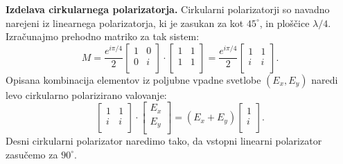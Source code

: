 \begin{example}{\bf Izdelava cirkularnega polarizatorja.}
\label{ex_circ}
Cirkularni polarizatorji so navadno narejeni iz linearnega polarizatorja, ki 
je zasukan za kot $45^\circ$, in ploščice $\lambda/4$. Izračunajmo prehodno 
matriko za tak sistem:
\begin{equation}
M = 
\frac{e^{i\pi/4}}{2}
\left[\begin{array}{cc}
1 & 0 \\
0 & i\\
\end{array}\right]
\cdot
\left[\begin{array}{cc}
1 & 1 \\
1 & 1\\
\end{array}\right] = \frac{e^{i\pi/4}}{2}
\left[\begin{array}{cc}
1 & 1 \\
i & i\\
\end{array}\right]\!\!.
\end{equation}
Opisana kombinacija elementov iz poljubne vpadne svetlobe $(E_x, E_y)$ naredi
levo cirkularno polarizirano valovanje:
\begin{equation}
\left[\begin{array}{cc}
1 & 1 \\
i & i\\
\end{array}\right]\cdot 
\left[\begin{array}{c}
E_x\\
E_y\\
\end{array}\right] = (E_x+E_y)
\left[\begin{array}{c}
1\\
i\\
\end{array}\right]\!\!.
\end{equation}
Desni cirkularni polarizator naredimo tako, da vstopni linearni polarizator
zasučemo za $90^\circ$.
\end{example}

